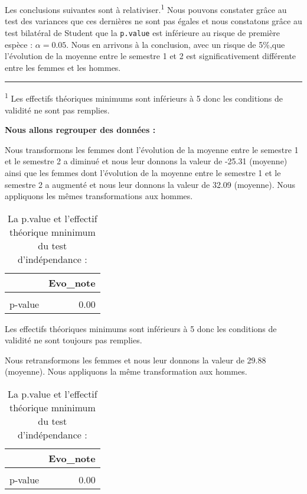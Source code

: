 \documentclass[
  11pt,
  french,
]{article}
\begin{document}
Les conclusions suivantes sont à relativiser.\textsuperscript{1} Nous
pouvons constater grâce au test des variances que ces dernières ne sont
pas égales et nous constatons grâce au test bilatéral de Student que la
\texttt{p.value} est inférieure au risque de première espèce :
\(\alpha = 0.05\). Nous en arrivons à la conclusion, avec un risque de
5\%,que l'évolution de la moyenne entre le semestre 1 et 2 est
significativement différente entre les femmes et les hommes.

\begin{center}\rule{0.5\linewidth}{0.5pt}\end{center}

\textsuperscript{1} Les effectifs théoriques minimums sont inférieurs à
5 donc les conditions de validité ne sont pas remplies.

\textbf{Nous allons regrouper des données :}

Nous transformons les femmes dont l'évolution de la moyenne entre le
semestre 1 et le semestre 2 a diminué et nous leur donnons la valeur de
-25.31 (moyenne) ainsi que les femmes dont l'évolution de la moyenne
entre le semestre 1 et le semestre 2 a augmenté et nous leur donnons la
valeur de 32.09 (moyenne). Nous appliquons les mêmes transformations aux
hommes.

\begin{table}[!h]

\caption{\label{tab:tests2_oui1}La p.value et l'effectif théorique mninimum du test d'indépendance :}
\centering
\begin{tabular}[t]{lr}
\toprule
  & Evo\_note\\
\midrule
\cellcolor{gray!6}{Eff\_théorique\_min} & \cellcolor{gray!6}{0.46}\\
p-value & 0.00\\
\bottomrule
\end{tabular}
\end{table}

Les effectifs théoriques minimums sont inférieurs à 5 donc les
conditions de validité ne sont toujours pas remplies.

Nous retransformons les femmes et nous leur donnons la valeur de 29.88
(moyenne). Nous appliquons la même transformation aux hommes.

\begin{table}[!h]

\caption{\label{tab:tests2_oui2}La p.value et l'effectif théorique mninimum du test d'indépendance :}
\centering
\begin{tabular}[t]{lr}
\toprule
  & Evo\_note\\
\midrule
\cellcolor{gray!6}{Eff\_théorique\_min} & \cellcolor{gray!6}{28.94}\\
p-value & 0.00\\
\bottomrule
\end{tabular}
\end{table}
\end{document}
